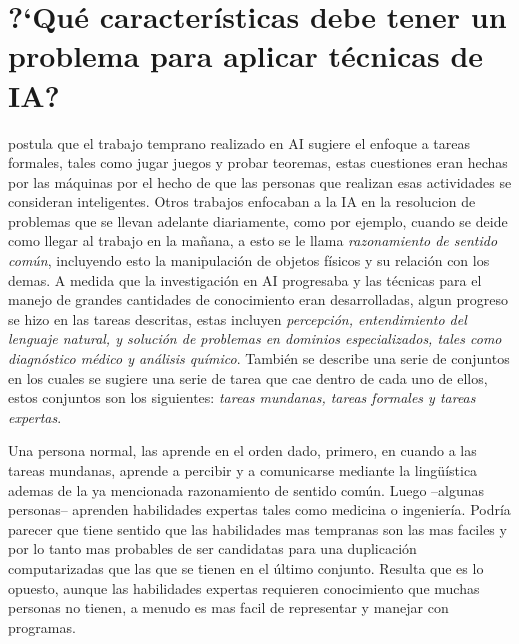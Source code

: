 \documentclass{article}
\begin{document}
\section{?`Qu\'e caracter\'isticas debe tener un problema para aplicar t\'ecnicas de IA?}
\label{sec:tecIA}
\cite{rich2009} postula que el trabajo temprano realizado en AI sugiere el enfoque a tareas formales, tales como jugar juegos y probar teoremas, estas cuestiones eran hechas por las m\'aquinas por el hecho de que las personas que realizan esas actividades se consideran inteligentes.
Otros trabajos enfocaban a la IA en la resolucion de problemas que se llevan adelante diariamente, como por ejemplo, cuando se deide como llegar al trabajo en la ma\~nana, a esto se le llama \textit{razonamiento de sentido com\'un}, incluyendo esto la manipulaci\'on de objetos f\'isicos y su relaci\'on con los demas. A medida que la investigaci\'on en AI progresaba y las t\'ecnicas para el manejo de grandes cantidades de conocimiento eran desarrolladas, algun progreso se hizo en las tareas descritas, estas incluyen \textit{percepci\'on, entendimiento del lenguaje natural, y soluci\'on de problemas en dominios especializados, tales como diagn\'ostico m\'edico y an\'alisis qu\'imico}.
Tambi\'en se describe una serie de conjuntos en los cuales se sugiere una serie de tarea que cae dentro de cada uno de ellos, estos conjuntos son los siguientes: \textit{tareas mundanas, tareas formales y tareas expertas}.

Una persona normal, las aprende en el orden dado, primero, en cuando a las tareas mundanas, aprende a percibir y a comunicarse mediante la ling\"u\'istica ademas de la ya mencionada razonamiento de sentido com\'un. Luego --algunas personas-- aprenden habilidades expertas tales como medicina o ingenier\'ia. Podr\'ia parecer que tiene sentido que las habilidades mas tempranas son las mas faciles y por lo tanto mas probables de ser candidatas para una duplicaci\'on computarizadas que las que se tienen en el \'ultimo conjunto. Resulta que es lo opuesto, aunque las habilidades expertas requieren conocimiento que muchas personas no tienen, a menudo es mas facil de representar y manejar con programas.
\end{document}
